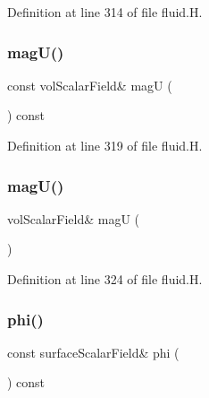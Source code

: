 Definition at line 314 of file fluid.\+H.

\mbox{\label{classFoam_1_1fluid_acf8ba8ee6c5a9062263b284c93b58111}} 
\subsubsection{\texorpdfstring{mag\+U()}{magU()}\hspace{0.1cm}{\footnotesize\ttfamily [1/2]}}
{\footnotesize\ttfamily const vol\+Scalar\+Field\& magU (\begin{DoxyParamCaption}{ }\end{DoxyParamCaption}) const\hspace{0.3cm}{\ttfamily [inline]}}



Definition at line 319 of file fluid.\+H.

\mbox{\label{classFoam_1_1fluid_acb3f43b4dbc83fb0392a7c04562cff5e}} 
\subsubsection{\texorpdfstring{mag\+U()}{magU()}\hspace{0.1cm}{\footnotesize\ttfamily [2/2]}}
{\footnotesize\ttfamily vol\+Scalar\+Field\& magU (\begin{DoxyParamCaption}{ }\end{DoxyParamCaption})\hspace{0.3cm}{\ttfamily [inline]}}



Definition at line 324 of file fluid.\+H.

\mbox{\label{classFoam_1_1fluid_afa376adc6cc59952d2f6f2ad38bba068}} 
\subsubsection{\texorpdfstring{phi()}{phi()}\hspace{0.1cm}{\footnotesize\ttfamily [1/2]}}
{\footnotesize\ttfamily const surface\+Scalar\+Field\& phi (\begin{DoxyParamCaption}{ }\end{DoxyParamCaption}) const\hspace{0.3cm}{\ttfamily [inline]}}



